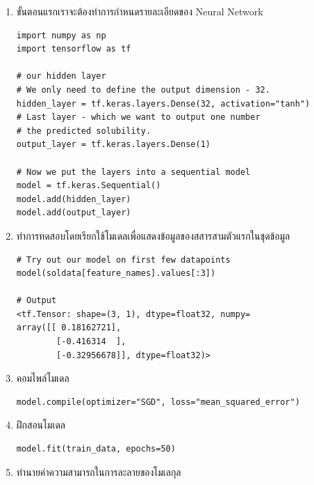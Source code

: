 \begin{enumerate}
\item ขั้นตอนแรกเราจะต้องทำการกำหนดรายละเอียดของ Neural Network

\begin{lstlisting}[style=MyPython]
import numpy as np
import tensorflow as tf

# our hidden layer
# We only need to define the output dimension - 32.
hidden_layer = tf.keras.layers.Dense(32, activation="tanh")
# Last layer - which we want to output one number
# the predicted solubility.
output_layer = tf.keras.layers.Dense(1)

# Now we put the layers into a sequential model
model = tf.keras.Sequential()
model.add(hidden_layer)
model.add(output_layer)
\end{lstlisting}

\vspace{1em}

\item ทำการทดสอบโดยเรียกใช้โมเดลเพื่อแสดงข้อมูลของสสารสามตัวแรกในชุดข้อมูล

\begin{lstlisting}[style=MyPython]
# Try out our model on first few datapoints
model(soldata[feature_names].values[:3])

# Output
<tf.Tensor: shape=(3, 1), dtype=float32, numpy=
array([[ 0.18162721],
        [-0.416314  ],
        [-0.32956678]], dtype=float32)>
\end{lstlisting}

\vspace{1em}

\item คอมไพล์โมเดล

\begin{lstlisting}[style=MyPython]
model.compile(optimizer="SGD", loss="mean_squared_error")
\end{lstlisting}

\vspace{1em}

\item ฝึกสอนโมเดล

\begin{lstlisting}[style=MyPython]
model.fit(train_data, epochs=50)
\end{lstlisting}

\vspace{1em}

\item ทำนายค่าความสามารถในการละลายของโมเลกุล


\end{enumerate}
